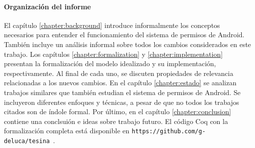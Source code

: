 \paragraph{Organización del informe}
El capítulo \ref{chapter:background} introduce informalmente los conceptos necesarios para entender
el funcionamiento del sistema de permisos de Android. También incluye un análisis informal sobre
todos los cambios considerados en este trabajo. Los capítulos \ref{chapter:formalization} y
\ref{chapter:implementation} presentan la formalización del modelo idealizado y su implementación,
respectivamente. Al final de cada uno, se discuten propiedades de relevancia relacionadas a los
nuevos cambios. En el capítulo \ref{chapter:estado} se analizan trabajos similares que también
estudian el sistema de permisos de Android. Se incluyeron diferentes enfoques y técnicas, a pesar de
que no todos los trabajos citados son de índole formal. Por último, en el capítulo
\ref{chapter:conclusion} contiene una conclsuión e ideas sobre trabajo futuro. El código Coq con la
formalización completa está disponible en
\texttt{https://github.com/g-deluca/tesina}~\cite{github-code}.